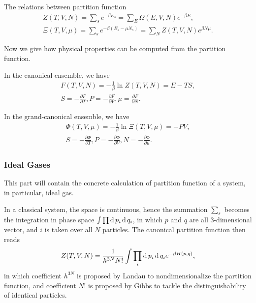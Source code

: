The relations between partition function
\begin{equation*}
	\begin{split}
		Z(T,V,N) = \sum_s e^{-\beta E_s} =\sum_E \Omega(E,V,N)e^{-\beta E},\\
		\Xi(T,V,\mu) = \sum_s e^{-\beta (E_s  - \mu N_s)} = \sum_N Z(T,V,N)e^{\beta N\mu}.
	\end{split}
\end{equation*}


Now we give how physical properties can be computed from the partition function.

In the canonical ensemble, we have
\begin{equation}
	\begin{split}
		F(T,V,N) = -\frac{1}{\beta}\ln Z(T,V,N) = E-TS,\\
	S=-\frac{\partial F}{\partial T}, P=-\frac{\partial F}{\partial V}, \mu = \frac{\partial F}{\partial N}.
	\end{split}
\end{equation}

In the grand-canonical ensemble, we have
\begin{equation}
	\begin{split}
		\Phi(T,V,\mu) = -\frac{1}{\beta}\ln\Xi(T,V,\mu) = -PV,\\
		S=-\frac{\partial\Phi}{\partial T}, P = -\frac{\partial\Phi}{\partial V}, N = -\frac{\partial\Phi}{\partial\mu}.
	\end{split}
\end{equation}

\subsubsection{Ideal Gases}
This part will contain the concrete calculation of partition function of a system, in particular, ideal gas.

In a classical system, the space is continuous, hence the summation $\sum_s$ becomes the integration in phase space $\int\prod\operatorname{d}p_i\operatorname{d}q_i$, in which $p$ and $q$ are all $3$-dimensional vector, and $i$ is taken over all $N$ particles. The canonical partition function then reads
\begin{equation}
	Z(T,V,N) = \frac{1}{h^{3N}N!}\int \prod_i\operatorname{d}p_i\operatorname{d}q_i e^{-\beta H(p,q)},
\end{equation}
in which coefficient $h^{3N}$ is proposed by Landau to nondimensionalize the partition function, and coefficient $N!$ is proposed by Gibbs to tackle the distinguishability of identical particles.

